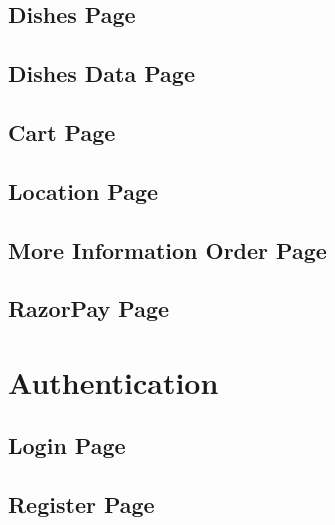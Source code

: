 \subsection{Dishes Page}

\subsection{Dishes Data Page}


\subsection{Cart Page}


\subsection{Location Page}


\subsection{More Information Order Page}

\subsection{RazorPay Page}

\section{Authentication}
\subsection{Login Page}

\subsection{Register Page}

